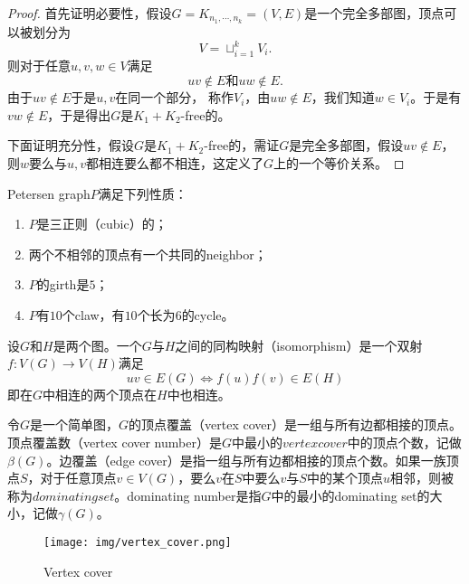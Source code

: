 \begin{proof}
	首先证明必要性，假设$G = K_{n_1,\cdots, n_k} = (V, E) $是一个完全多部图，顶点可以被划分为
	\begin{equation*}
		V = \sqcup_{i=1}^k V_i.
	\end{equation*}
	则对于任意$u, v, w\in V$满足
	\begin{equation*}
		uv\notin E\text{和}uw\notin E.
	\end{equation*}
	由于$uv\notin E$于是$u,v$在同一个部分， 称作$V_i$，由$uw\notin E$，我们知道$w\in V_i$。于是有$vw\notin E$，于是得出$G$是$K_1+K_2$-free的。\par
	下面证明充分性，假设$G$是$K_1+K_2$-free的，需证$G$是完全多部图，假设$uv\notin E$，则$w$要么与$u,v$都相连要么都不相连，这定义了$G$上的一个等价关系。
\end{proof}
\begin{proposition}
	Petersen graph$P$满足下列性质：
	\begin{enumerate}
		\item $P$是三正则（cubic）的；
		\item 两个不相邻的顶点有一个共同的neighbor；
		\item $P$的girth是$5$；
		\item $P$有$10$个claw，有$10$个长为$6$的cycle。
	\end{enumerate}
\end{proposition}
\begin{definition}
	设$G$和$H$是两个图。一个$G$与$H$之间的同构映射（isomorphism）是一个双射$f:V(G)\rightarrow V(H)$满足
	\begin{equation*}
		uv\in E(G) \Leftrightarrow f(u)f(v)\in E(H)
	\end{equation*}
	即在$G$中相连的两个顶点在$H$中也相连。
\end{definition}
\begin{definition}
	令$G$是一个简单图，$G$的顶点覆盖（vertex cover）是一组与所有边都相接的顶点。顶点覆盖数（vertex cover number）是$G$中最小的$vertex cover$中的顶点个数，记做$\beta(G)$。边覆盖（edge cover）是指一组与所有边都相接的顶点个数。如果一族顶点$S$，对于任意顶点$v\in V(G)$，要么$v$在$S$中要么$v$与$S$中的某个顶点$u$相邻，则被称为$dominating set$。dominating number是指$G$中的最小的dominating set的大小，记做$\gamma(G)$。
\end{definition}
\begin{figure*}[h]
	\centering
\texttt{[image: img/vertex\_cover.png]}
	\caption{Vertex cover\label{fig:vertex cover}}
\end{figure*}
